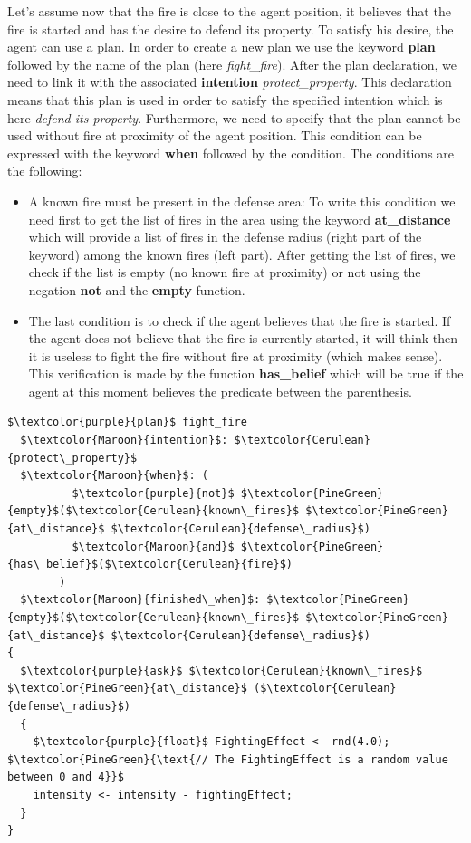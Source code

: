 \documentclass[12pt, a4paper]{memoir} %
\begin{document}
			Let's assume now that the fire is close to the agent position, it believes that the fire is started and has the desire
			to defend its property. To satisfy his desire, the agent can use a plan. In order to create a new plan we
			use the keyword \textbf{plan} followed by the name of the plan (here \textit{fight\_fire}). After the plan declaration, we need
			to link it with the associated \textbf{intention} \textit{protect\_property}. This declaration means that this plan is used
			in order to satisfy the specified intention which is here \textit{defend its property}. Furthermore, we need to specify that the plan cannot be used without
			fire at proximity of the agent position. This condition can be expressed with the keyword \textbf{when} followed by the condition.
			\newline
			The conditions are the following:
			\begin{itemize}
				\item A known fire must be present in the defense area: To write this condition we need first to get the list of fires in
				the area using the keyword \textbf{at\_distance}  which will provide a list of fires in the defense radius (right part of the keyword) among the
				known fires (left part). After getting the list of fires, we check if the list is empty (no known fire at proximity) or not using the
				negation \textbf{not} and the \textbf{empty} function.
				\item The last condition is to check if the agent believes that the fire is started. If the agent does not believe that the fire is
				currently started, it will think then it is useless to fight the fire without fire at proximity (which makes sense). This verification is
				made by the function \textbf{has\_belief} which will be true if the agent at this moment believes the predicate between the parenthesis.
			\end{itemize}

			\begin{lstlisting}[mathescape,caption=Plans declaration.,label=code:bdi]
$\textcolor{purple}{plan}$ fight_fire
  $\textcolor{Maroon}{intention}$: $\textcolor{Cerulean}{protect\_property}$
  $\textcolor{Maroon}{when}$: (
          $\textcolor{purple}{not}$ $\textcolor{PineGreen}{empty}$($\textcolor{Cerulean}{known\_fires}$ $\textcolor{PineGreen}{at\_distance}$ $\textcolor{Cerulean}{defense\_radius}$)
          $\textcolor{Maroon}{and}$ $\textcolor{PineGreen}{has\_belief}$($\textcolor{Cerulean}{fire}$)
        )
  $\textcolor{Maroon}{finished\_when}$: $\textcolor{PineGreen}{empty}$($\textcolor{Cerulean}{known\_fires}$ $\textcolor{PineGreen}{at\_distance}$ $\textcolor{Cerulean}{defense\_radius}$)
{
  $\textcolor{purple}{ask}$ $\textcolor{Cerulean}{known\_fires}$ $\textcolor{PineGreen}{at\_distance}$ ($\textcolor{Cerulean}{defense\_radius}$)
  {
    $\textcolor{purple}{float}$ FightingEffect <- rnd(4.0); $\textcolor{PineGreen}{\text{// The FightingEffect is a random value between 0 and 4}}$
    intensity <- intensity - fightingEffect;
  }
}
			\end{lstlisting}
\end{document}
